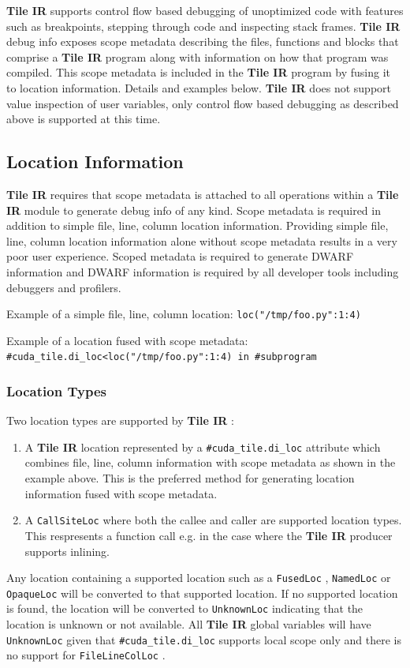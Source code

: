 \documentclass{article}
\begin{document}
\textbf{Tile IR} supports control flow based debugging of unoptimized code with features such as breakpoints, stepping through code and inspecting stack frames. \textbf{Tile IR} debug info exposes scope metadata describing the files, functions and blocks that comprise a \textbf{Tile IR} program along with information on how that program was compiled. This scope metadata is included in the \textbf{Tile IR} program by fusing it to location information. Details and examples below. \textbf{Tile IR} does not support value inspection of user variables, only control flow based debugging as described above is supported at this time.


\subsection{Location Information}

\textbf{Tile IR} requires that scope metadata is attached to all operations within a \textbf{Tile IR} module to generate debug info of any kind. Scope metadata is required in addition to simple file, line, column location information. Providing simple file, line, column location information alone without scope metadata results in a very poor user experience. Scoped metadata is required to generate DWARF information and DWARF information is required by all developer tools including debuggers and profilers.


Example of a simple file, line, column location: \texttt{loc("/tmp/foo.py":1:4)}


Example of a location fused with scope metadata: \texttt{\#cuda\_tile.di\_loc<loc("/tmp/foo.py":1:4) in \#subprogram}


\subsubsection{Location Types}

Two location types are supported by \textbf{Tile IR} :


\begin{enumerate}
\item A \textbf{Tile IR} location represented by a \texttt{\#cuda\_tile.di\_loc} attribute which combines file, line, column information with scope metadata as shown in the example above. This is the preferred method for generating location information fused with scope metadata.
\item A \texttt{CallSiteLoc} where both the callee and caller are supported location types. This respresents a function call e.g. in the case where the \textbf{Tile IR} producer supports inlining.

\end{enumerate}
Any location containing a supported location such as a \texttt{FusedLoc} , \texttt{NamedLoc} or \texttt{OpaqueLoc} will be converted to that supported location. If no supported location is found, the location will be converted to \texttt{UnknownLoc} indicating that the location is unknown or not available. All \textbf{Tile IR} global variables will have \texttt{UnknownLoc} given that \texttt{\#cuda\_tile.di\_loc} supports local scope only and there is no support for \texttt{FileLineColLoc} .
\end{document}
